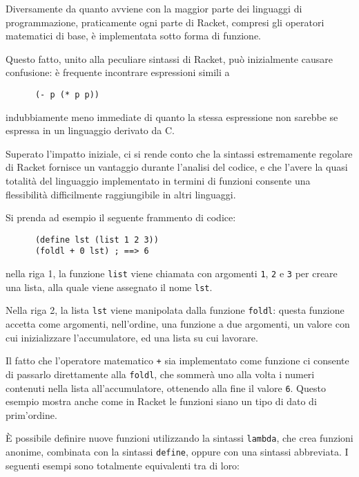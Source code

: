 Diversamente da quanto avviene con la maggior parte dei linguaggi di
programmazione, praticamente ogni parte di Racket, compresi gli operatori
matematici di base, \`e implementata sotto forma di funzione.

Questo fatto, unito alla peculiare sintassi di Racket, pu\`o inizialmente
causare confusione: \`e frequente incontrare espressioni simili a

\begin{lstlisting}
      (- p (* p p))
\end{lstlisting}

indubbiamente meno immediate di quanto la stessa espressione non sarebbe
se espressa in un linguaggio derivato da C.

Superato l'impatto iniziale, ci si rende conto che la sintassi estremamente
regolare di Racket fornisce un vantaggio durante l'analisi del codice, e
che l'avere la quasi totalit\`a del linguaggio implementato in termini di
funzioni consente una flessibilit\`a difficilmente raggiungibile in altri
linguaggi.

Si prenda ad esempio il seguente frammento di codice:

\begin{lstlisting}
      (define lst (list 1 2 3))
      (foldl + 0 lst) ; ==> 6
\end{lstlisting}

nella riga 1, la funzione \lstinline{list} viene chiamata con argomenti
\lstinline{1}, \lstinline{2} e \lstinline{3} per creare una lista, alla
quale viene assegnato il nome \lstinline{lst}.

Nella riga 2, la lista \lstinline{lst} viene manipolata dalla funzione
\lstinline{foldl}: questa funzione accetta come argomenti, nell'ordine,
una funzione a due argomenti, un valore con cui inizializzare
l'accumulatore, ed una lista su cui lavorare.

Il fatto che l'operatore matematico \lstinline{+} sia implementato come
funzione ci consente di passarlo direttamente alla \lstinline{foldl}, che
sommer\`a uno alla volta i numeri contenuti nella lista all'accumulatore,
ottenendo alla fine il valore \lstinline{6}. Questo esempio mostra anche
come in Racket le funzioni siano un tipo di dato di prim'ordine.

\`E possibile definire nuove funzioni utilizzando la sintassi
\lstinline{lambda}, che crea funzioni anonime, combinata con la sintassi
\lstinline{define}, oppure con una sintassi abbreviata. I seguenti esempi
sono totalmente equivalenti tra di loro:

